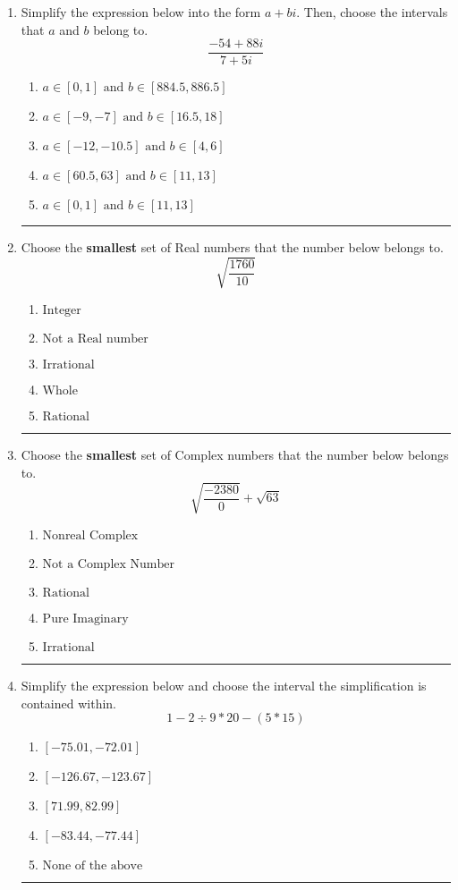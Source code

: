 \documentclass[14pt]{extbook}
\newcommand{\litem}[1]{\item#1\hspace*{-1cm}\rule{\textwidth}{0.4pt}}
\begin{document}
\begin{enumerate}
{\begin{enumerate}[label=\Alph*.]
\end{enumerate} }
\litem{
Simplify the expression below into the form $a+bi$. Then, choose the intervals that $a$ and $b$ belong to.\[ \frac{-54 + 88 i}{7 + 5 i} \]\begin{enumerate}[label=\Alph*.]
\item \( a \in [0, 1] \text{ and } b \in [884.5, 886.5] \)
\item \( a \in [-9, -7] \text{ and } b \in [16.5, 18] \)
\item \( a \in [-12, -10.5] \text{ and } b \in [4, 6] \)
\item \( a \in [60.5, 63] \text{ and } b \in [11, 13] \)
\item \( a \in [0, 1] \text{ and } b \in [11, 13] \)

\end{enumerate} }
\litem{
Choose the \textbf{smallest} set of Real numbers that the number below belongs to.\[ \sqrt{\frac{1760}{10}} \]\begin{enumerate}[label=\Alph*.]
\item \( \text{Integer} \)
\item \( \text{Not a Real number} \)
\item \( \text{Irrational} \)
\item \( \text{Whole} \)
\item \( \text{Rational} \)

\end{enumerate} }
\litem{
Choose the \textbf{smallest} set of Complex numbers that the number below belongs to.\[ \sqrt{\frac{-2380}{0}}+\sqrt{63} \]\begin{enumerate}[label=\Alph*.]
\item \( \text{Nonreal Complex} \)
\item \( \text{Not a Complex Number} \)
\item \( \text{Rational} \)
\item \( \text{Pure Imaginary} \)
\item \( \text{Irrational} \)

\end{enumerate} }
\litem{
Simplify the expression below and choose the interval the simplification is contained within.\[ 1 - 2 \div 9 * 20 - (5 * 15) \]\begin{enumerate}[label=\Alph*.]
\item \( [-75.01, -72.01] \)
\item \( [-126.67, -123.67] \)
\item \( [71.99, 82.99] \)
\item \( [-83.44, -77.44] \)
\item \( \text{None of the above} \)


\end{enumerate}}
\end{enumerate}
\end{document}

